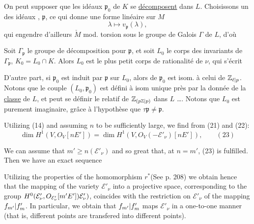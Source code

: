 On peut supposer que les idéaux $\mathfrak p_0$ de $K$ se \uline{décomposent} dans $L$. Choisissons un des  idéaux , $\mathfrak p$, ce qui donne une forme linéaire  sur $M$
\[
\lambda\longmapsto v_{\mathfrak p}(\lambda),
\]
qui engendre d'ailleurs $\check M$ mod. torsion sous le groupe de Galois $\Gamma$ de $L$, d'où

Soit $\Gamma_{\mathfrak p}$ le groupe de décomposition pour $\mathfrak p$,   et soit  $L_0$ le corps des invariants de $\Gamma_{\mathfrak p}$, $K_0=L_0\cap K$. Alors $L_0$ est le plus petit corps de rationalité de $\nu$, qui s'écrit 

D'autre part, si $\mathfrak p_0$ est induit par $\mathfrak p$ sur $L_0$, alors   de $\mathfrak p_0$ est  isom. à celui de $\mathbb Z_{{\ell|p}}$. Notons que le couple $(L_0,\mathfrak p_0)$ est défini à isom unique près par la donnée de la \uline{classe} de $L$, et peut se définir   le  relatif de $\mathbb Z_{({p\mathbb Z|p})}$ dans $L$ \dots. Notons que $L_0$ est purement imaginaire, grâce à l'hypothèse que $\tau\mathfrak p\ne\mathfrak p$.

Utilizing (14) and assuming $n$ to be sufficiently large, we find from (21) and (22):
\[
\dim H^1(V,O_V[nE'])=\dim H^1(V,O_V(-\mathcal E'_\nu)[nE']),\qquad (23)
\]

We can assume that $m'\ge n(\mathcal E'_\nu)$ and so great that, at $n=m'$, (23) is fulfilled. Then we have an exact sequence

Utilizing the properties of the homomorphism $r^*$(See p. 208) we obtain hence that the mapping of the variety $\mathcal E'_\nu$ into a projective space, corresponding to the group ${H^0(\mathcal E'_\nu,O_{\mathcal E'_\nu}[m'E'])\mathcal E'_\nu)}$, coincides with the restriction on $\mathcal E'_\nu$ of the mapping ${f_{m'}|f_m'}$. In particular, we obtain that ${f_{m'}|f_m'}$ maps $\mathcal E'_\nu$ in a one-to-one manner (that is, different points are transfered into different points).

